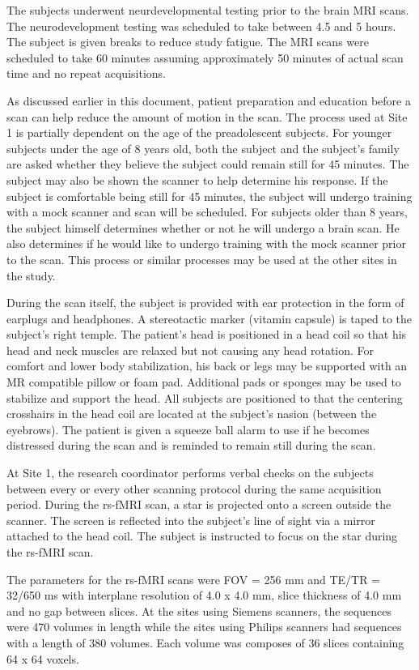 The subjects underwent neurdevelopmental testing prior to the brain MRI scans. The neurodevelopment testing was scheduled to take between 4.5 and 5 hours. The subject is given breaks to reduce study fatigue. The MRI scans were scheduled to take 60 minutes assuming approximately 50 minutes of actual scan time and no repeat acquisitions. 

As discussed earlier in this document, patient preparation and education before a scan can help reduce the amount of motion in the scan. The process used at Site 1 is partially dependent on the age of the preadolescent subjects. For younger subjects under the age of 8 years old, both the subject and the subject's family are asked whether they believe the subject could remain still for 45 minutes. The subject may also be shown the scanner to help determine his response. If the subject is comfortable being still for 45 minutes, the subject will undergo training with a mock scanner and scan will be scheduled. For subjects older than 8 years, the subject himself determines whether or not he will undergo a brain scan. He also determines if he would like to undergo training with the mock scanner prior to the scan. This process or similar processes may be used at the other sites in the study.

During the scan itself, the subject is provided with ear protection in the form of earplugs and headphones. A stereotactic marker (vitamin capsule) is taped to the subject's right temple. The patient's head is positioned in a head coil so that his head and neck muscles are relaxed but not causing any head rotation. For comfort and lower body stabilization, his back or legs may be supported with an MR compatible pillow or foam pad. Additional pads or sponges may be used to stabilize and support the head. All subjects are positioned to that the centering crosshairs in the head coil are located at the subject's nasion (between the eyebrows). The patient is given a squeeze ball alarm to use if he becomes distressed during the scan and is reminded to remain still during the scan. 

At Site 1, the research coordinator performs verbal checks on the subjects between every or every other scanning protocol during the same acquisition period. During the rs-fMRI scan, a star is projected onto a screen outside the scanner. The screen is reflected into the subject's line of sight via a mirror attached to the head coil. The subject is instructed to focus on the star during the rs-fMRI scan.

The parameters for the rs-fMRI scans were FOV = 256 mm and TE/TR = 32/650 ms with interplane resolution of 4.0 x 4.0 mm, slice thickness of 4.0 mm and no gap between slices. At the sites using Siemens scanners, the sequences were 470 volumes in length while the sites using Philips scanners had sequences with a length of 380 volumes. Each volume was composes of 36 slices containing 64 x 64 voxels.

